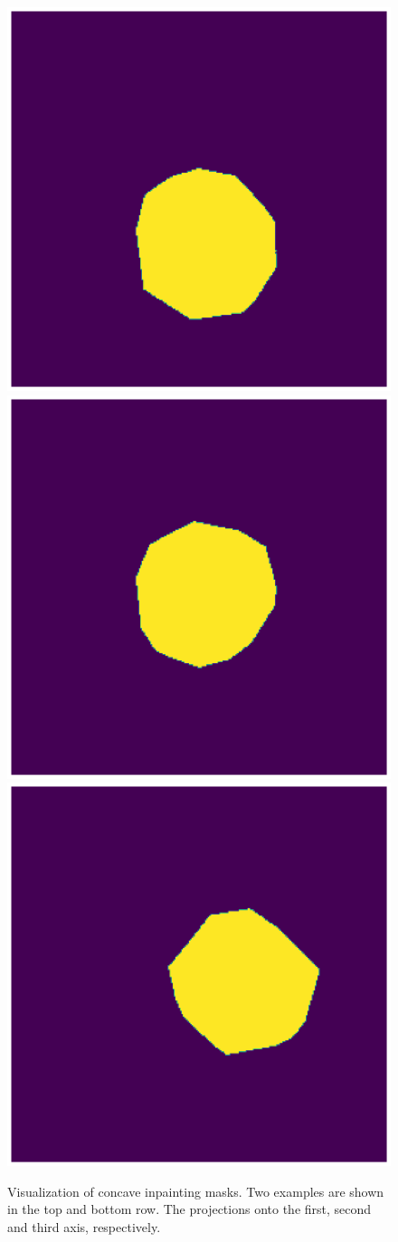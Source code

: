 \documentclass[10pt,aspectratio=169]{beamer}
\begin{document}
\begin{frame}
\begin{minipage}{0.4\textwidth}
\begin{figure}[htb]
         \includegraphics[height=0.3\textwidth, width=0.3\columnwidth]{_figs/s1_2_concave}
         \includegraphics[height=0.3\textwidth, width=0.3\columnwidth]{_figs/s2_2_concave}
         \includegraphics[height=0.3\textwidth, width=0.3\columnwidth]{_figs/s3_2_concave}
\caption{Visualization of concave inpainting masks. Two examples are shown in the top and bottom row. The projections onto the first, second and third axis, respectively.}
\label{fig:ellipses}
\end{figure}
\end{minipage}
\vfill
\end{frame}
\end{document}
